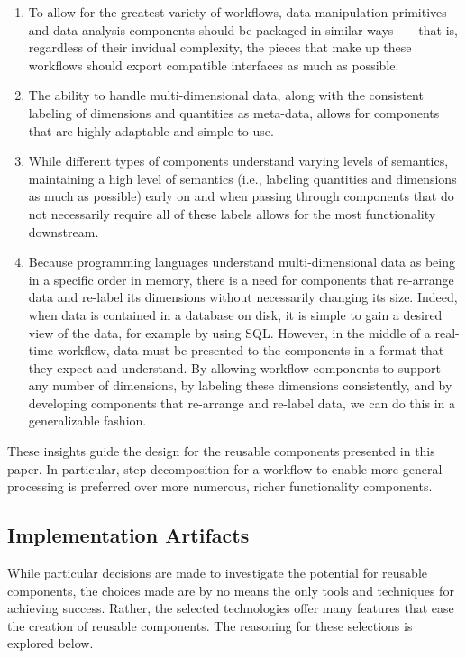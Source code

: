 \documentclass[conference]{IEEEtran}
\begin{document}
\begin{enumerate}

\item To allow for the greatest variety of workflows, data manipulation
primitives and data analysis components should be packaged in similar ways —-
that is, regardless of their invidual complexity, the pieces that make up these
workflows should export compatible interfaces as much as possible.

\item The ability to handle multi-dimensional data, along with the consistent
labeling of dimensions and quantities as meta-data, allows for components that
are highly adaptable and simple to use.

\item While different types of components understand varying levels of
semantics, maintaining a high level of semantics (i.e., labeling quantities and
dimensions as much as possible) early on and when passing through components
that do not necessarily require all of these labels allows for the most
functionality downstream.

\item Because programming languages understand multi-dimensional data as being
in a specific order in memory, there is a need for components that re-arrange
data and re-label its dimensions without necessarily changing its size. Indeed,
when data is contained in a database on disk, it is simple to gain a desired
view of the data, for example by using SQL. However, in the middle of a
real-time workflow, data must be presented to the components in a format that
they expect and understand. By allowing workflow components to support any
number of dimensions, by labeling these dimensions consistently, and by
developing components that re-arrange and re-label data, we can do this in a
generalizable fashion.

\end{enumerate}

These insights guide the design for the reusable components presented in this
paper. In particular, step decomposition for a workflow to enable more general
processing is preferred over more numerous, richer functionality components.

\subsection{Implementation Artifacts}

While particular decisions are made to investigate the potential for reusable
components, the choices made are by no means the only tools and techniques for
achieving success. Rather, the selected technologies offer many features that
ease the creation of reusable components. The reasoning for these selections is
explored below.
\end{document}
